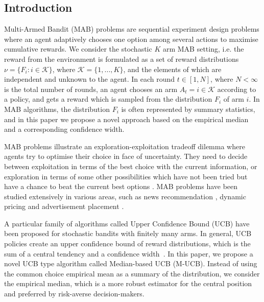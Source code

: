 \subsection{Introduction}

Multi-Armed Bandit (MAB) problems are sequential experiment design problems where an agent adaptively chooses one option among several actions to maximise cumulative rewards.
We consider the stochastic $K$ arm MAB setting, i.e.
the reward from the environment is formulated as a set of reward distributions
$\nu = \{F_i: i \in \mathcal{K}\}$, where $\mathcal{K} = \{1, ..., K\}$,
and the elements of which are independent and unknown to the agent.
In each round $t \in [1,N]$, where $N < \infty$ is the total number of rounds, an agent chooses an arm $A_t = i \in \mathcal{K}$ according to a policy, and gets a reward which is sampled from the distribution $F_i$ of arm $i$.
In MAB algorithms, the distribution $F_i$ is often represented by summary statistics,
and in this paper we propose a novel approach based on the empirical median
and a corresponding confidence width.

MAB problems illustrate an exploration-exploitation tradeoff dilemma where agents try to optimise their choice in face of uncertainty.
They need to decide between exploitation in terms of the best choice with the current information, or exploration in terms of some other possibilities which have not been tried but have a chance to beat the current best options \cite{lattimore2018bandit}.
MAB problems have been studied extensively in various areas, such as news recommendation \cite{li2010contextual}, dynamic pricing \cite{babaioff2015dynamic} and advertisement placement \cite{schwartz2017customer}.

A particular family of algorithms called Upper Confidence Bound (UCB) have been proposed for stochastic bandits with finitely many arms.
In general, UCB policies create an upper confidence bound of reward distributions, which is the sum of a central tendency and a confidence width~\cite{lattimore2018bandit}.
In this paper, we propose a novel UCB type algorithm called Median-based UCB (M-UCB).
Instead of using the common choice empirical mean as a summary of the distribution,
we consider the empirical median, which is a more robust estimator for the central position and preferred by risk-averse decision-makers.


